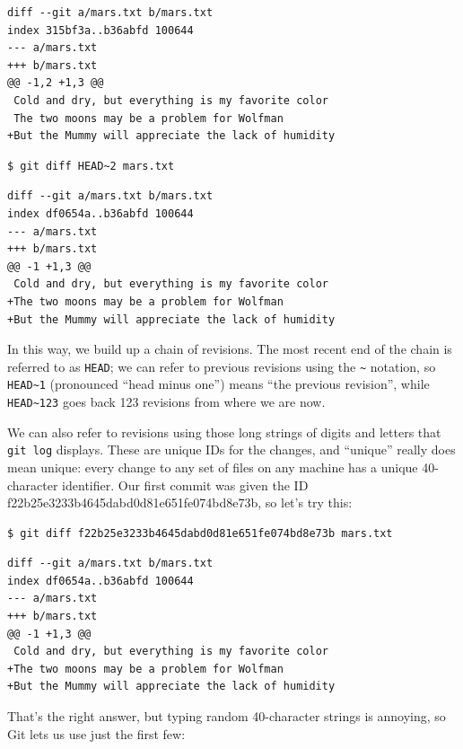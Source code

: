 \documentclass[]{book}
\begin{document}
\begin{verbatim}
diff --git a/mars.txt b/mars.txt
index 315bf3a..b36abfd 100644
--- a/mars.txt
+++ b/mars.txt
@@ -1,2 +1,3 @@
 Cold and dry, but everything is my favorite color
 The two moons may be a problem for Wolfman
+But the Mummy will appreciate the lack of humidity
\end{verbatim}

\begin{verbatim}
$ git diff HEAD~2 mars.txt
\end{verbatim}

\begin{verbatim}
diff --git a/mars.txt b/mars.txt
index df0654a..b36abfd 100644
--- a/mars.txt
+++ b/mars.txt
@@ -1 +1,3 @@
 Cold and dry, but everything is my favorite color
+The two moons may be a problem for Wolfman
+But the Mummy will appreciate the lack of humidity
\end{verbatim}

In this way, we build up a chain of revisions. The most recent end of
the chain is referred to as \texttt{HEAD}; we can refer to previous
revisions using the \texttt{\textasciitilde{}} notation, so
\texttt{HEAD\textasciitilde{}1} (pronounced ``head minus one'') means
``the previous revision'', while \texttt{HEAD\textasciitilde{}123} goes
back 123 revisions from where we are now.

We can also refer to revisions using those long strings of digits and
letters that \texttt{git log} displays. These are unique IDs for the
changes, and ``unique'' really does mean unique: every change to any set
of files on any machine has a unique 40-character identifier. Our first
commit was given the ID f22b25e3233b4645dabd0d81e651fe074bd8e73b, so
let's try this:

\begin{verbatim}
$ git diff f22b25e3233b4645dabd0d81e651fe074bd8e73b mars.txt
\end{verbatim}

\begin{verbatim}
diff --git a/mars.txt b/mars.txt
index df0654a..b36abfd 100644
--- a/mars.txt
+++ b/mars.txt
@@ -1 +1,3 @@
 Cold and dry, but everything is my favorite color
+The two moons may be a problem for Wolfman
+But the Mummy will appreciate the lack of humidity
\end{verbatim}

That's the right answer, but typing random 40-character strings is
annoying, so Git lets us use just the first few:
\end{document}
